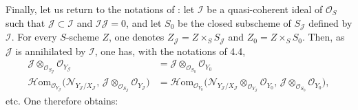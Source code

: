 Finally, let us return to the notations of : let \(\mathcal{I}\) be a quasi-coherent ideal of \(\mathcal{O}_{S}\) such that \(\mathcal{J}\subset\mathcal{I}\) and \(\mathcal{I}\mathcal{J}=0\), and let \(S_{0}\) be the closed subscheme of \(S_{\mathcal{J}}\) defined by \(\mathcal{I}\). For every \(S\)-scheme \(Z\), one denotes \(Z_{\mathcal{J}}=Z\times_{S}S_{\mathcal{J}}\) and \(Z_{0}=Z\times_{S}S_{0}\). Then, as \(\mathcal{J}\) is annihilated by \(\mathcal{I}\), one has, with the notations of 4.4,
\begin{align*}
\mathcal{J}\otimes_{\mathcal{O}_{S_{\mathcal{J}}}}\mathcal{O}_{Y_{\mathcal{J}}}
&=
\mathcal{J}\otimes_{\mathcal{O}_{S_{0}}}\mathcal{O}_{Y_{0}}\\
\mathcal{H}\mathrm{om}_{\mathcal{O}_{Y_{\mathcal{J}}}}\bigl(\mathcal{N}_{Y_{\mathcal{J}}/X_{\mathcal{J}}},\,\mathcal{J}\otimes_{\mathcal{O}_{S_{\mathcal{J}}}}\mathcal{O}_{Y_{\mathcal{J}}}\bigr)
&=
\mathcal{H}\mathrm{om}_{\mathcal{O}_{Y_{0}}}\bigl(\mathcal{N}_{Y_{\mathcal{J}}/X_{\mathcal{J}}}\otimes_{\mathcal{O}_{Y_{\mathcal{J}}}}\mathcal{O}_{Y_{0}},\,\mathcal{J}\otimes_{\mathcal{O}_{S_{0}}}\mathcal{O}_{Y_{0}}\bigr),
\end{align*}
etc. One therefore obtains:

